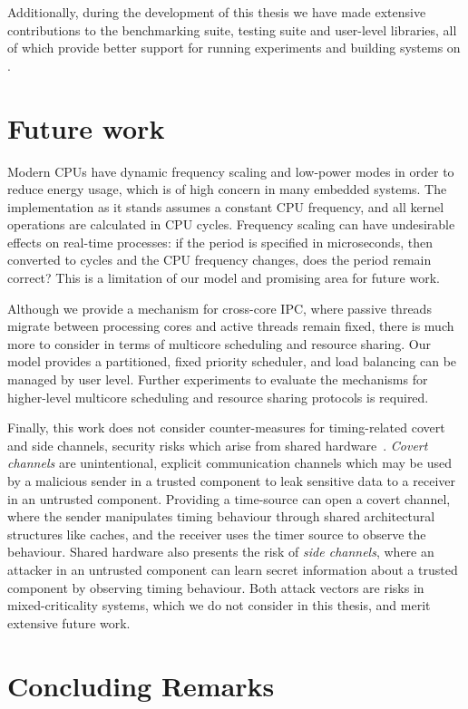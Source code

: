 Additionally, during the development of this thesis we have made extensive contributions to the 
\selfour benchmarking suite, testing suite and user-level libraries, all of which provide better 
support for running experiments and building systems on \selfour. 

\section{Future work}

Modern \glspl{CPU} have dynamic frequency scaling and low-power modes in order to reduce energy usage, which
is of high concern in many embedded systems. The implementation as it stands assumes a constant
\gls{CPU} frequency, and all kernel operations are calculated in \gls{CPU} cycles. Frequency scaling
can have undesirable effects on real-time processes: if the period is specified in microseconds, then
converted to cycles and the CPU frequency changes, does the period remain correct? This is a
limitation of our model and promising area for future work.

Although we provide a mechanism for cross-core IPC, where passive threads migrate between processing
cores and active threads remain fixed, there is much more to consider in terms of multicore
scheduling and resource sharing. Our model provides a partitioned, fixed priority scheduler, and 
load balancing can be managed by user level. Further experiments to evaluate the mechanisms for higher-level
multicore scheduling and resource sharing protocols is required. 

Finally, this work does not consider counter-measures for timing-related covert and side channels,
security risks which arise from
shared hardware~\citep{Ge_YCH_18}. \emph{Covert channels} are unintentional, explicit communication
channels which may be used by a malicious sender in a trusted component to leak sensitive data to a receiver
in an untrusted component. Providing a time-source can open a covert channel, where the sender
manipulates timing behaviour through shared architectural structures like caches, and the receiver
uses the timer source to observe the behaviour. Shared hardware also presents the risk of
\emph{side channels}, 
where an attacker in an untrusted
component can learn secret information about a trusted component by observing timing behaviour. 
Both attack vectors are risks in mixed-criticality systems, which we do not consider in this
thesis, and merit extensive future work. 

\section{Concluding Remarks}

